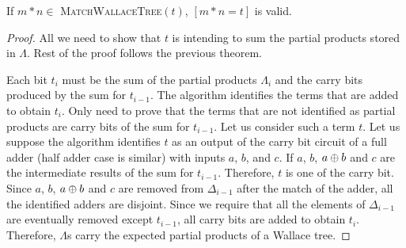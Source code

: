 \begin{thm}
  If $m*n\in$ \textsc{MatchWallaceTree}$(t)$, $[m*n = t]$ is valid.
\end{thm}
\begin{proof}
  All we need to show that $t$ is intending to sum the partial products
  stored in $\Lambda$. Rest of the proof follows the previous theorem.
  
  Each bit $t_i$ must be the sum of the partial products $\Lambda_i$ and 
  the carry bits produced by the sum for $t_{i-1}$.
  The algorithm identifies the terms that are added to obtain $t_i$.
  Only need to prove that the terms that are not identified as
  partial products are carry bits of the sum for $t_{i-1}$.
  Let us consider such a term $t$.
  Let us suppose the algorithm identifies $t$ as an output of the carry
  bit circuit of a full adder (half adder case is similar) with inputs
  $a$, $b$, and $c$.
  If $a$, $b$, $a \oplus b$ and $c$ are the intermediate
  results of the sum for $t_{i-1}$.
  Therefore, $t$ is one of the carry bit.
  Since $a$, $b$, $a \oplus b$ and $c$ are removed from $\Delta_{i-1}$
  after the match of the adder,
  all the identified adders are disjoint.
  Since we require that all the elements of $\Delta_{i-1}$  are eventually
  removed except $t_{i-1}$, all carry bits are added to obtain $t_i$.
  Therefore, $\Lambda$s carry the expected partial products of a Wallace tree.
\end{proof}


